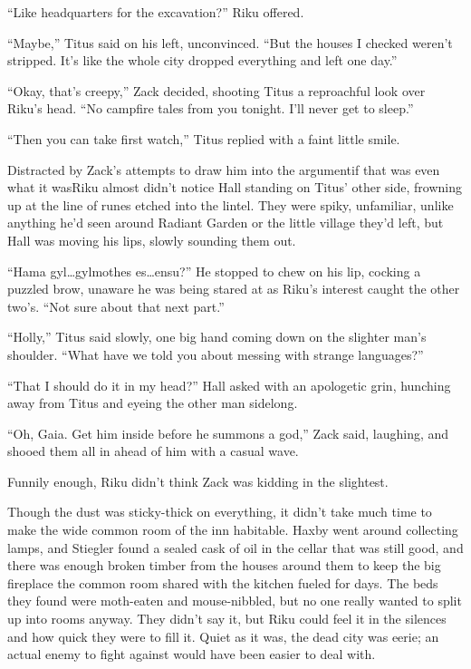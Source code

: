 ``Like headquarters for the excavation?'' Riku offered.

``Maybe,'' Titus said on his left, unconvinced. ``But the houses I checked weren't stripped. It's like the whole city dropped everything and left one day.''

``Okay, that's creepy,'' Zack decided, shooting Titus a reproachful look over Riku's head. ``No campfire tales from you tonight. I'll never get to sleep.''

``Then you can take first watch,'' Titus replied with a faint little smile.

Distracted by Zack's attempts to draw him into the argument\textemdash if that was even what it was\textemdash Riku almost didn't notice Hall standing on Titus' other side, frowning up at the line of runes etched into the lintel. They were spiky, unfamiliar, unlike anything he'd seen around Radiant Garden or the little village they'd left, but Hall was moving his lips, slowly sounding them out.

``Hama gyl\ldots gylmothes es\ldots ensu?'' He stopped to chew on his lip, cocking a puzzled brow, unaware he was being stared at as Riku's interest caught the other two's. ``Not sure about that next part.''

``Holly,'' Titus said slowly, one big hand coming down on the slighter man's shoulder. ``What have we told you about messing with strange languages?''

``That I should do it in my head?'' Hall asked with an apologetic grin, hunching away from Titus and eyeing the other man sidelong.

``Oh, Gaia. Get him inside before he summons a god,'' Zack said, laughing, and shooed them all in ahead of him with a casual wave.

Funnily enough, Riku didn't think Zack was kidding in the slightest.

Though the dust was sticky-thick on everything, it didn't take much time to make the wide common room of the inn habitable. Haxby went around collecting lamps, and Stiegler found a sealed cask of oil in the cellar that was still good, and there was enough broken timber from the houses around them to keep the big fireplace the common room shared with the kitchen fueled for days. The beds they found were moth-eaten and mouse-nibbled, but no one really wanted to split up into rooms anyway. They didn't say it, but Riku could feel it in the silences and how quick they were to fill it. Quiet as it was, the dead city was eerie; an actual enemy to fight against would have been easier to deal with.

